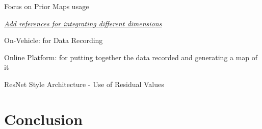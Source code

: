 \documentclass{article}
\begin{document}
	Focus on Prior Maps usage
	
	\underline{\textit{Add references for integrating different dimensions}}
	
	On-Vehicle: for Data Recording
	
	Online Platform: for putting together the data recorded and generating a map of it
	
	ResNet Style Architecture - Use of Residual Values 
	
	\section{Conclusion}
	
	
	


\end{document}
